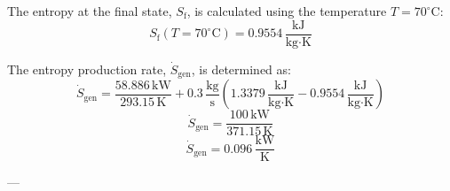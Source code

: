 The entropy at the final state, \( S_{\text{f}} \), is calculated using the temperature \( T = 70^\circ\text{C} \):  
\[
S_{\text{f}}(T = 70^\circ\text{C}) = 0.9554 \, \frac{\text{kJ}}{\text{kg·K}}
\]

The entropy production rate, \( \dot{S}_{\text{gen}} \), is determined as:  
\[
\dot{S}_{\text{gen}} = \frac{58.886 \, \text{kW}}{293.15 \, \text{K}} + 0.3 \, \frac{\text{kg}}{\text{s}} \left( 1.3379 \, \frac{\text{kJ}}{\text{kg·K}} - 0.9554 \, \frac{\text{kJ}}{\text{kg·K}} \right)
\]  
\[
\dot{S}_{\text{gen}} = \frac{100 \, \text{kW}}{371.15 \, \text{K}}
\]  
\[
\dot{S}_{\text{gen}} = 0.096 \, \frac{\text{kW}}{\text{K}}
\]

---